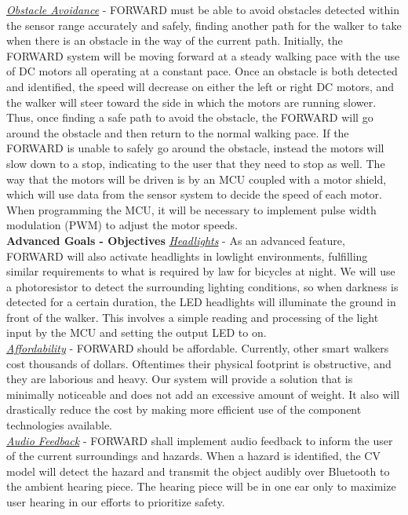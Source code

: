 \noindent \underline{\textit{Obstacle Avoidance}} - FORWARD must be able to avoid obstacles detected within the sensor range accurately and safely, finding another path for the walker to take when there is an obstacle in the way of the current path. Initially, the FORWARD system will be moving forward at a steady walking pace with the use of DC motors all operating at a constant pace. Once an obstacle is both detected and identified, the speed will decrease on either the left or right DC motors, and the walker will steer toward the side in which the motors are running slower. Thus, once finding a safe path to avoid the obstacle, the FORWARD will go around the obstacle and then return to the normal walking pace. If the FORWARD is unable to safely go around the obstacle, instead the motors will slow down to a stop, indicating to the user that they need to stop as well. The way that the motors will be driven is by an MCU coupled with a motor shield, which will use data from the sensor system to decide the speed of each motor. When programming the MCU, it will be necessary to implement pulse width modulation (PWM) to adjust the motor speeds.\\

\noindent \textbf{Advanced Goals - Objectives} \newline
\noindent \underline{\textit{Headlights}} - As an advanced feature, FORWARD will also activate headlights in lowlight environments, fulfilling similar requirements to what is required by law for bicycles at night. We will use a photoresistor to detect the surrounding lighting conditions, so when darkness is detected for a certain duration, the LED headlights will illuminate the ground in front of the walker. This involves a simple reading and processing of the light input by the MCU and setting the output LED to on. \\

\noindent \underline{\textit{Affordability}} - FORWARD should be affordable. Currently, other smart walkers cost thousands of dollars. Oftentimes their physical footprint is obstructive, and they are laborious and heavy. Our system will provide a solution that is minimally noticeable and does not add an excessive amount of weight. It also will drastically reduce the cost by making more efficient use of the component technologies available. \\

\noindent \underline{\textit{Audio Feedback}} - FORWARD shall implement audio feedback to inform the user of the current surroundings and hazards. When a hazard is identified, the CV model will detect the hazard and transmit the object audibly over Bluetooth to the ambient hearing piece. The hearing piece will be in one ear only to maximize user hearing in our efforts to prioritize safety. \\

